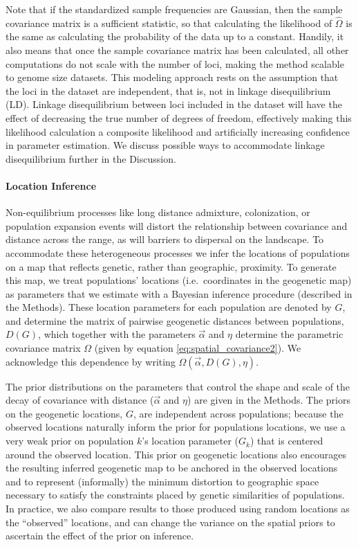\documentclass[10pt,letterpaper]{article}
\begin{document}
Note that if the standardized sample frequencies are Gaussian, then the sample covariance matrix is a sufficient statistic,
so that calculating the likelihood of $\widehat \Omega$ is the same as calculating the probability of the data up to a constant.
Handily, it also means that once the sample covariance matrix has been calculated, 
all other computations do not scale with the number of loci, making the method scalable to genome size datasets. 
This modeling approach rests on the assumption that the loci in the dataset are independent, that is, not in linkage disequilibrium (LD).
Linkage disequilibrium between loci included in the dataset will have the effect of decreasing the true number of degrees of freedom, 
effectively making this likelihood calculation a composite likelihood and artificially increasing confidence in parameter estimation.
We discuss possible ways to accommodate linkage disequilibrium further in the Discussion.

\paragraph{Location Inference} 
Non-equilibrium processes like long distance admixture, colonization, or population expansion events will distort the relationship between covariance and distance across the range, as will barriers to dispersal on the landscape. To accommodate these heterogeneous processes we infer the locations of populations on a map that reflects genetic, rather than geographic, proximity.  
To generate this map, we treat populations' locations (i.e.\ coordinates in the geogenetic map)
as parameters that we estimate
with a Bayesian inference procedure (described in the Methods).
These location parameters for each population are denoted by $G$,
and determine the matrix of pairwise geogenetic distances between populations, $D(G)$,
which together with the parameters $\vec{\alpha}$ and $\eta$ determine
the parametric covariance matrix $\Omega$ (given by equation \eqref{eq:spatial_covariance2}).
We acknowledge this dependence by writing $\Omega(\vec{\alpha},{D}(G),\eta)$.  

The prior distributions on the parameters that control the shape and scale of the decay of covariance with distance ($\vec{\alpha}$ and $\eta$) are given in the Methods.
The priors on the geogenetic locations, $G$, are independent across populations;  
because the observed locations naturally inform the prior for populations locations, 
we use a very weak prior on population $k$'s location parameter ($G_k$) that is centered around the observed location.
This prior on geogenetic locations
also encourages the resulting inferred geogenetic map to be anchored in the observed locations 
and to represent (informally) the minimum distortion to geographic space necessary to satisfy the constraints placed by genetic similarities of populations.  
In practice, we also compare results to those produced using random locations as the ``observed'' locations, 
and can change the variance on the spatial priors to ascertain the effect of the prior on inference. 
\end{document}
